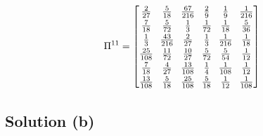 \[ \arraycolsep=3.4pt\def\arraystretch{1.2}
\Pi^{11} = \left[\begin{matrix}\frac{2}{27} & \frac{5}{18} & \frac{67}{216} & \frac{2}{9} & \frac{1}{9} & \frac{1}{216}\\\frac{7}{18} & \frac{5}{72} & \frac{1}{3} & \frac{1}{72} & \frac{1}{18} & \frac{5}{36}\\\frac{1}{3} & \frac{43}{216} & \frac{2}{27} & \frac{1}{3} & \frac{1}{216} & \frac{1}{18}\\\frac{25}{108} & \frac{11}{72} & \frac{10}{27} & \frac{5}{72} & \frac{5}{54} & \frac{1}{12}\\\frac{7}{18} & \frac{4}{27} & \frac{13}{108} & \frac{1}{4} & \frac{1}{108} & \frac{1}{12}\\\frac{13}{108} & \frac{5}{18} & \frac{25}{108} & \frac{5}{18} & \frac{1}{12} & \frac{1}{108}\end{matrix}\right] \]

\subsection*{Solution (b)}

